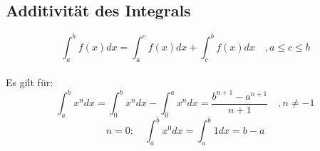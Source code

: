 \subsection{Additivität des Integrals}
\[ \boxed{\int_a^b f(x) dx = \int_a^c f(x) dx + \int_c^b f(x) dx \quad , a \leq c \leq b} \]
\\
Es gilt für: 
\[ \boxed{\int_a^b x^n dx = \int_0^b x^n dx - \int_0^a x^n dx = \frac{b^{n+1} - a^{n+1}}{n + 1} \quad , n \neq -1} \]
\[ \boxed{n = 0: \quad \int_a^b x^0 dx = \int_a^b 1 dx = b - a} \]
